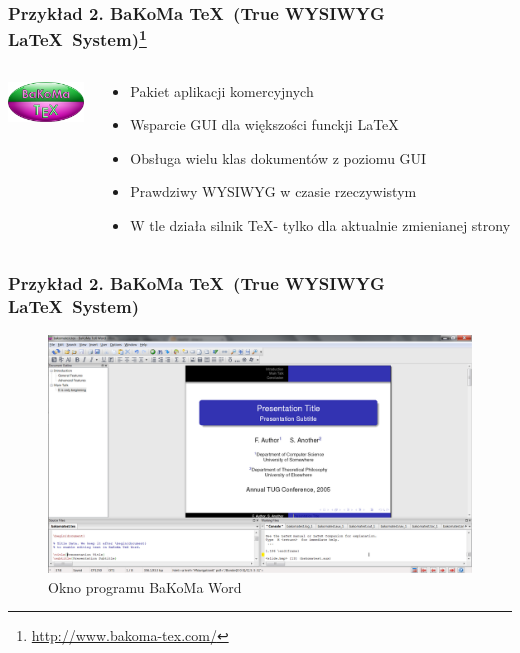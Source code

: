 \documentclass[t]{beamer}
\begin{document}
\begin{frame}[t]
	\frametitle{Przykład 2. BaKoMa \TeX\ (True WYSIWYG \LaTeX\ System)\footnote{\url{http://www.bakoma-tex.com/}}}
		\begin{columns}[T]
			\begin{column}{.15\textwidth}
				\includegraphics[width=2cm]{bakoma_logo.png}
			\end{column}
			\begin{column}{.85\textwidth}
				\begin{itemize}
					\item Pakiet aplikacji komercyjnych 
					\item Wsparcie GUI dla większości funckji \LaTeX\ 
					\item Obsługa wielu klas dokumentów z poziomu GUI
					\item Prawdziwy WYSIWYG w czasie rzeczywistym
					\item W tle działa silnik \TeX - tylko dla aktualnie zmienianej strony
				\end{itemize}
			\end{column}		
		\end{columns}
\end{frame}

\begin{frame}[t]
	\frametitle{Przykład 2. BaKoMa \TeX\ (True WYSIWYG \LaTeX\ System)}
		\begin{figure}[p]
     	    \centering
			\includegraphics[width=.95\textwidth]{bakoma_prtscn.png}
     	    \caption{Okno programu BaKoMa Word}
		\end{figure}
		
\end{frame}
\end{document}
